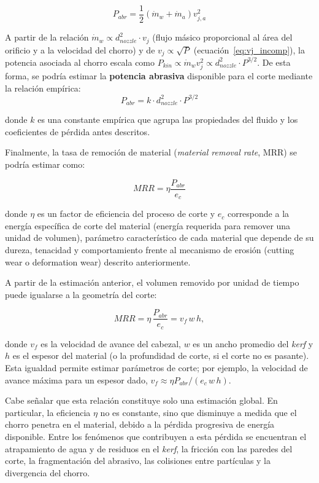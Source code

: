 \begin{equation}
	P_{abr}=\frac{1}{2}(\dot{m}_{w}+\dot{m}_{a})v_{j,a}^{2}
\end{equation}

A partir de la relación $\dot m_w \propto d_{nozzle}^2 \cdot v_j$ (flujo másico proporcional al área del orificio y a la velocidad del chorro) y de $v_j \propto \sqrt{P}$ (ecuación~\eqref{eq:vj_incomp}), la potencia asociada al chorro escala como $P_{kin}\propto \dot m_w v_j^2 \propto d_{nozzle}^2 \cdot P^{3/2}$. De esta forma, se podría estimar la \textbf{potencia abrasiva} disponible para el corte mediante la relación empírica:
\begin{equation}
	P_{abr} = k \cdot d_{nozzle}^2 \cdot P^{3/2}
	\label{eq:pabr}
\end{equation}

donde $k$ es una constante empírica que agrupa las propiedades del fluido y los coeficientes de pérdida antes descritos.

Finalmente, la tasa de remoción de material (\textit{material removal rate}, MRR) se podría estimar como:

\begin{equation}
	MRR = \eta \frac{P_{abr}}{e_c}
	\label{eq:mrr}
\end{equation}

donde $\eta$ es un factor de eficiencia del proceso de corte y $e_c$ corresponde a la energía específica de corte del material (energía requerida para remover una unidad de volumen), parámetro característico de cada material que depende de su dureza, tenacidad y comportamiento frente al mecanismo de erosión (cutting wear o deformation wear) descrito anteriormente.

A partir de la estimación anterior, el volumen removido por unidad de tiempo puede igualarse a la geometría del corte:

\begin{equation}
	MRR = \eta \, \frac{P_{abr}}{e_c} = v_f \, w \, h,
	\label{eq:mrr_geom}
\end{equation}

donde $v_f$ es la velocidad de avance del cabezal, $w$ es un ancho promedio del \textit{kerf} y $h$ es el espesor del material (o la profundidad de corte, si el corte no es pasante). Esta igualdad permite estimar parámetros de corte; por ejemplo, la velocidad de avance máxima para un espesor dado, $v_f \approx \eta P_{abr}/(e_c\, w\, h)$.

Cabe señalar que esta relación constituye solo una estimación global. En particular, la eficiencia $\eta$ no es constante, sino que disminuye a medida que el chorro penetra en el material, debido a la pérdida progresiva de energía disponible. Entre los fenómenos que contribuyen a esta pérdida se encuentran el atrapamiento de agua y de residuos en el \textit{kerf}, la fricción con las paredes del corte, la fragmentación del abrasivo, las colisiones entre partículas y la divergencia del chorro.

